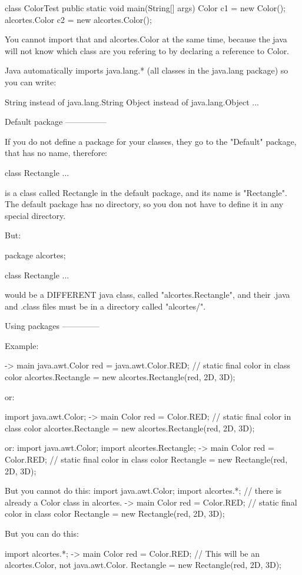 \documentclass[a4paper, 9pt]{extarticle}
\begin{document}
\begin{blackboard}
class ColorTest {
    public static void main(String[] args) {
        Color c1 = new Color();
        alcortes.Color c2 = new alcortes.Color();
    }
}

You cannot import that and alcortes.Color at the same time, because the java
will not know which class are you refering to by declaring a reference to
Color.

Java automatically imports java.lang.* (all classes in the java.lang package)
so you can write:

String instead of java.lang.String
Object instead of java.lang.Object
...


Default package
---------------

If you do not define a package for your classes, they go to the "Default"
package, that has no name, therefore:

class Rectangle {
...
}

is a class called Rectangle in the default package, and its name is
"Rectangle". The default package has no directory, so you don not have to
define it in any special directory.

But:

package alcortes;

class Rectangle {
...
}

would be a DIFFERENT java class, called "alcortes.Rectangle", and their .java
and .class files must be in a directory called "alcortes/".


Using packages
--------------

Example:

-> main
java.awt.Color red = java.awt.Color.RED; // static final color in class color
alcortes.Rectangle = new alcortes.Rectangle(red, 2D, 3D);

or:

import java.awt.Color;
-> main
Color red = Color.RED; // static final color in class color
alcortes.Rectangle = new alcortes.Rectangle(red, 2D, 3D);

or:
import java.awt.Color;
import alcortes.Rectangle;
-> main
Color red = Color.RED; // static final color in class color
Rectangle = new Rectangle(red, 2D, 3D);

But you cannot do this:
import java.awt.Color;
import alcortes.*;  // there is already a Color class in alcortes.
-> main
Color red = Color.RED; // static final color in class color
Rectangle = new Rectangle(red, 2D, 3D);


But you can do this:

import alcortes.*;
-> main
Color red = Color.RED; // This will be an alcortes.Color, not java.awt.Color.
Rectangle = new Rectangle(red, 2D, 3D);


\end{blackboard}
\end{document}
